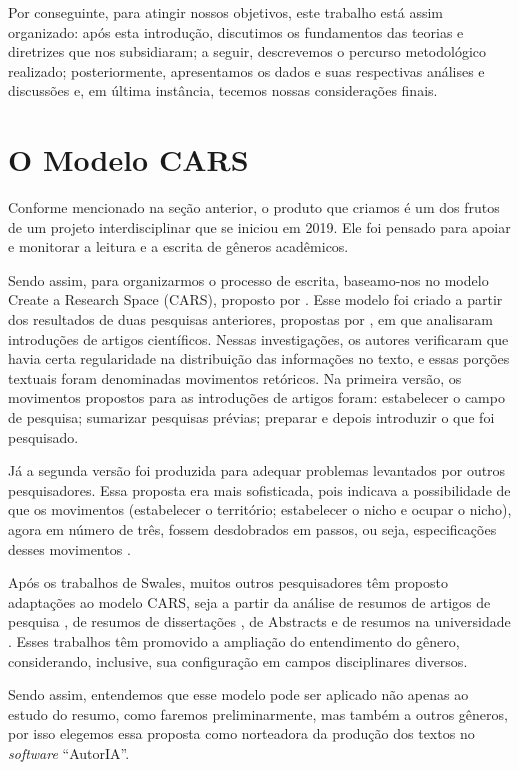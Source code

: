 \documentclass[portuguese]{textolivre}
\begin{document}
Por conseguinte, para atingir nossos objetivos, este trabalho está assim organizado: após esta introdução, discutimos os fundamentos das teorias e diretrizes que nos subsidiaram; a seguir, descrevemos o percurso metodológico realizado; posteriormente, apresentamos os dados e suas respectivas análises e discussões e, em última instância, tecemos nossas considerações finais.


\section{O Modelo CARS}\label{sec-conduta}
Conforme mencionado na seção anterior, o produto que criamos é um dos frutos de um projeto interdisciplinar que se iniciou em 2019. Ele foi pensado para apoiar e monitorar a leitura e a escrita de gêneros acadêmicos.

Sendo assim, para organizarmos o processo de escrita, baseamo-nos no modelo Create a Research Space (CARS), proposto por \textcite{swales1990}. Esse modelo foi criado a partir dos resultados de duas pesquisas anteriores, propostas por \textcite{swales1984,swales1987}, em que analisaram introduções de artigos científicos. Nessas investigações, os autores verificaram que havia certa regularidade na distribuição das informações no texto, e essas porções textuais foram denominadas movimentos retóricos.
Na primeira versão, os movimentos propostos para as introduções de artigos foram: estabelecer o campo de pesquisa; sumarizar pesquisas prévias; preparar e depois introduzir o que foi pesquisado.

Já a segunda versão foi produzida para adequar problemas levantados por outros pesquisadores. Essa proposta era mais sofisticada, pois indicava a possibilidade de que os movimentos (estabelecer o território; estabelecer o nicho e ocupar o nicho), agora em número de três, fossem desdobrados em passos, ou seja, especificações desses movimentos \cite{biasi-rodrigues2009}.

Após os trabalhos de Swales, muitos outros pesquisadores têm proposto adaptações ao modelo CARS, seja a partir da análise de resumos de artigos de pesquisa \cite{santos1995academic}, de resumos de dissertações \cite{biasi-rodrigues1998}, de Abstracts \cite{motta-roth2010} e de resumos na universidade \cite{silva2021producao,caetanooliveira2020}. Esses trabalhos têm promovido a ampliação do entendimento do gênero, considerando, inclusive, sua configuração em campos disciplinares diversos.

Sendo assim, entendemos que esse modelo pode ser aplicado não apenas ao estudo do resumo, como faremos preliminarmente, mas também a outros gêneros, por isso elegemos essa proposta como norteadora da produção dos textos no \textit{software} “AutorIA”.
\end{document}
